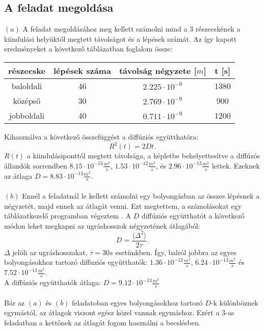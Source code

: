 \documentclass[12pt]{article}
\begin{document}
 \subsection*{A feladat megoldása}
$(a) $ A feladat megoldásához meg kellett számolni mind a 3 részecskének a kiindulási helyüktől megtett távolságot és a lépések számát. Az így kapott eredményeket a következő táblázatban foglalom össze:
\begin{center}
\begin{tabular}{|c|c|c|c|}\hline

részecske & lépések száma & távolság négyzete [$ m$]& t [s]\\ \hline 
baloldali &46 &$2.225 \cdot 10^{-9}$ &1380 \\ \hline
középső &30 & $2.769 \cdot 10^{-9}$& 900 \\ \hline
jobboldali &40  &$0.711\cdot 10^{-9}$ &1200   \\ \hline

\end{tabular}
\end{center}

Kihasználva a következő összefüggést a diffúziós együtthatóra:
$$R^2(t) = 2 D t.$$
$R(t)$ a kiindulásiponttól megtett távolsága,  a képletbe behelyettesítve a diffúzós állandók sorrendben $8.15\cdot 10^{-13} \frac{m^2}{s}$, $1.53\cdot 10^{-12} \frac{m^2}{s}$, és $2.96\cdot 10^{-13} \frac{m^2}{s}$ lettek. Ezeknek az átlaga $D = 8.83\cdot 10^{-13} \frac{m^2}{s}$. \\ \\
$(b)$ Ennél a feladatnál le kellett számolni egy bolyongásban az összes lépésnek a négyzetét, majd ennek az átlagát venni. Ezt megtettem, a számolásokat egy táblázatkezelő programban végeztem \cite{wik} . A  $D$ diffúziós együtthatót a következő módon lehet megkapni az ugráshosszok négyzetének átlagából:
$$D = \frac{\langle \Delta ^2 \rangle }{2\tau}.$$
$\Delta$ jelöli az ugráshosszakat, $\tau = 30 s$ esetünkben. Így, balról jobbra az egyes bolyongásokhoz tartozó diffuziós együtthatók: $1.36\cdot 10^{-12}\frac{m^2}{s}$, $6.24\cdot 10^{-13} \frac{m^2}{s}$ és $7.52\cdot 10^{-13} \frac{m^2}{s}$. \\ A diffúziós együtthatók átlaga: $D = 9.12\cdot 10^{-13} \frac{m^2}{s}$
\\\\
Bár az $(a)$ és  $(b)$ feladatoban egyes bolyongásokhoz tartozó $D$-k különböznek egymástól, az átlagok viszont egész közel vannak egymáshoz. Ezért a  $3$-as feladatban a kettőnek az átlagát fogom használni a becslésben.
\newpage
\end{document}
